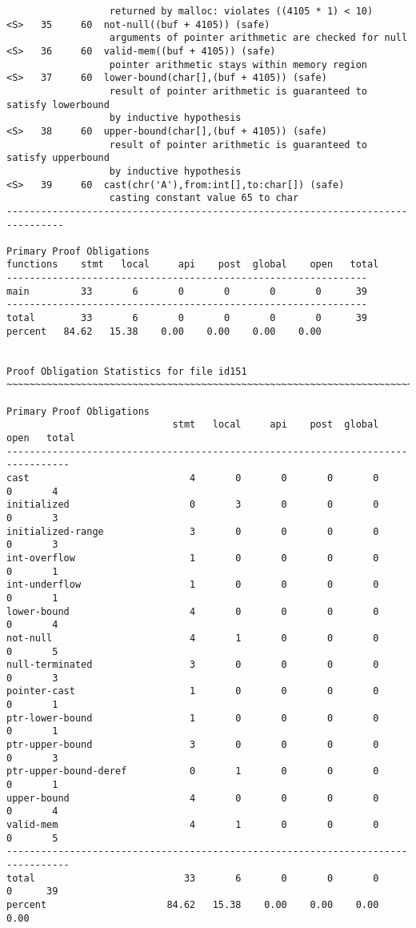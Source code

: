 \documentclass[11pt]{article}
\begin{document}
\begin{small}
\begin{verbatim}
                  returned by malloc: violates ((4105 * 1) < 10)
<S>   35     60  not-null((buf + 4105)) (safe)
                  arguments of pointer arithmetic are checked for null
<S>   36     60  valid-mem((buf + 4105)) (safe)
                  pointer arithmetic stays within memory region
<S>   37     60  lower-bound(char[],(buf + 4105)) (safe)
                  result of pointer arithmetic is guaranteed to satisfy lowerbound 
                  by inductive hypothesis
<S>   38     60  upper-bound(char[],(buf + 4105)) (safe)
                  result of pointer arithmetic is guaranteed to satisfy upperbound 
                  by inductive hypothesis
<S>   39     60  cast(chr('A'),from:int[],to:char[]) (safe)
                  casting constant value 65 to char
--------------------------------------------------------------------------------

Primary Proof Obligations
functions    stmt   local     api    post  global    open   total
---------------------------------------------------------------
main         33       6       0       0       0       0      39
---------------------------------------------------------------
total        33       6       0       0       0       0      39
percent   84.62   15.38    0.00    0.00    0.00    0.00


Proof Obligation Statistics for file id151
~~~~~~~~~~~~~~~~~~~~~~~~~~~~~~~~~~~~~~~~~~~~~~~~~~~~~~~~~~~~~~~~~~~~~~~~~~~~~~~~

Primary Proof Obligations
                             stmt   local     api    post  global    open   total
---------------------------------------------------------------------------------
cast                            4       0       0       0       0       0       4
initialized                     0       3       0       0       0       0       3
initialized-range               3       0       0       0       0       0       3
int-overflow                    1       0       0       0       0       0       1
int-underflow                   1       0       0       0       0       0       1
lower-bound                     4       0       0       0       0       0       4
not-null                        4       1       0       0       0       0       5
null-terminated                 3       0       0       0       0       0       3
pointer-cast                    1       0       0       0       0       0       1
ptr-lower-bound                 1       0       0       0       0       0       1
ptr-upper-bound                 3       0       0       0       0       0       3
ptr-upper-bound-deref           0       1       0       0       0       0       1
upper-bound                     4       0       0       0       0       0       4
valid-mem                       4       1       0       0       0       0       5
---------------------------------------------------------------------------------
total                          33       6       0       0       0       0      39
percent                     84.62   15.38    0.00    0.00    0.00    0.00
\end{verbatim}
\end{small}
\end{document}
